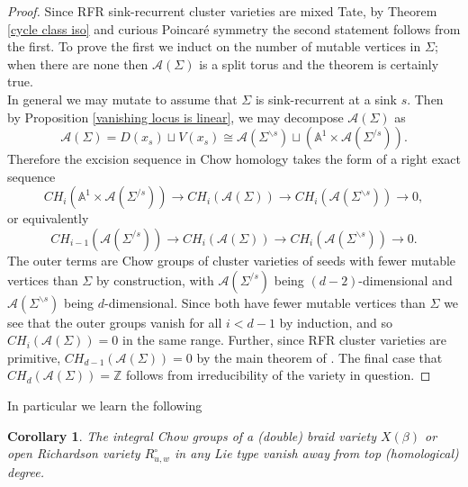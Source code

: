 \documentclass[11pt]{amsart}
\newtheorem{cor}[thm]{Corollary}
\theoremstyle{definition}
\theoremstyle{remark}
\numberwithin{equation}{section}
\begin{document}
\begin{proof}
Since RFR sink-recurrent cluster varieties are mixed Tate, by Theorem \ref{cycle class iso} and curious Poincar\'e symmetry the second statement follows from the first. To prove the first we induct on the number of mutable vertices in $\Sigma$; when there are none then $\mathcal{A}(\Sigma)$ is a split torus and the theorem is certainly true.\\

In general we may mutate to assume that $\Sigma$ is sink-recurrent at a sink $s$. Then by Proposition \ref{vanishing locus is linear}, we may decompose $\mathcal{A}(\Sigma)$ as \begin{equation}
    \mathcal{A}(\Sigma) = D(x_s) \sqcup V(x_s) \cong \mathcal{A}(\Sigma^{\backslash s}) \sqcup (\mathbb{A}^1 \times \mathcal{A}(\Sigma^{/s})).
\end{equation}
Therefore the excision sequence in Chow homology takes the form of a right exact sequence \begin{equation}
    CH_{i}(\mathbb{A}^1 \times \mathcal{A}(\Sigma^{/s})) \rightarrow CH_i(\mathcal{A}(\Sigma)) \rightarrow CH_i(\mathcal{A}(\Sigma^{\backslash s})) \rightarrow 0,
\end{equation}
or equivalently
\begin{equation}
    CH_{i-1}(\mathcal{A}(\Sigma^{/s})) \rightarrow CH_i(\mathcal{A}(\Sigma)) \rightarrow CH_i(\mathcal{A}(\Sigma^{\backslash s})) \rightarrow 0.
\end{equation}
The outer terms are Chow groups of cluster varieties of seeds with fewer mutable vertices than $\Sigma$ by construction, with $\mathcal{A}(\Sigma^{/s})$ being $(d - 2)$-dimensional and $\mathcal{A}(\Sigma^{\backslash s})$ being $d$-dimensional. Since both have fewer mutable vertices than $\Sigma$ we see that the outer groups vanish for all $i < {d-1}$ by induction, and so $CH_i(\mathcal{A}(\Sigma)) = 0$ in the same range. Further, since RFR cluster varieties are primitive, $CH_{d-1}(\mathcal{A}(\Sigma)) = 0$ by the main theorem of \cite{cao2024valuation}. The final case that $CH_d(\mathcal{A}(\Sigma)) = \mathbb{Z}$ follows from irreducibility of the variety in question.
\end{proof}

In particular we learn the following

\begin{cor}
    The integral Chow groups of a (double) braid variety $X(\beta)$ or open Richardson variety $R_{u,w}^\circ$ in any Lie type vanish away from top (homological) degree.
\end{cor}
\end{document}
